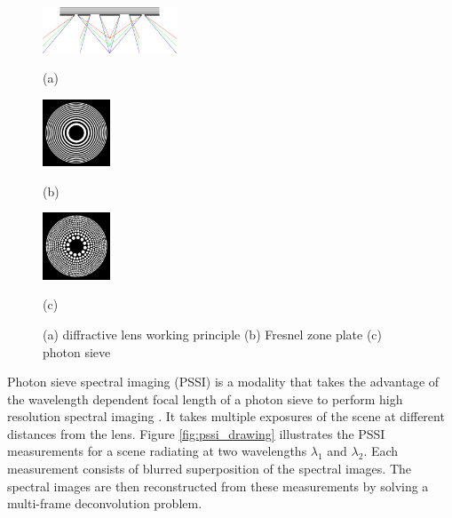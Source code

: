 \documentclass{article}
\begin{document}
\begin{figure}[htb]

\begin{minipage}[b]{0.48\linewidth}
  \centering
  \centerline{\includegraphics[width=4.0cm]{diffraction_ps_rgb}}
  \centerline{(a)}\medskip
\end{minipage}
\hfill
\begin{minipage}[b]{0.24\linewidth}
  \centering
  \centerline{\includegraphics[width=2.0cm]{zoneplate}}
  \centerline{(b)}\medskip
\end{minipage}
\hfill
\begin{minipage}[b]{0.24\linewidth}
  \centering
  \centerline{\includegraphics[width=2.0cm]{photonsieve}}
  \centerline{(c)}\medskip
\end{minipage}
\caption{(a) diffractive lens working principle (b) Fresnel zone
plate (c) photon sieve}
\label{fig:diff_lens}
%
\end{figure}

Photon sieve spectral imaging (PSSI) is a modality that takes the advantage of
the wavelength dependent focal length of a photon sieve to perform high
resolution spectral imaging \cite{oktem2014icip}. It takes multiple exposures of
the scene at different distances from the lens. Figure \ref{fig:pssi_drawing}
illustrates the PSSI measurements for a scene radiating at two wavelengths
$\lambda_1$ and $\lambda_2$. Each measurement consists of blurred superposition
of the spectral images. The spectral images are then reconstructed from these
measurements by solving a multi-frame deconvolution problem.
\end{document}
